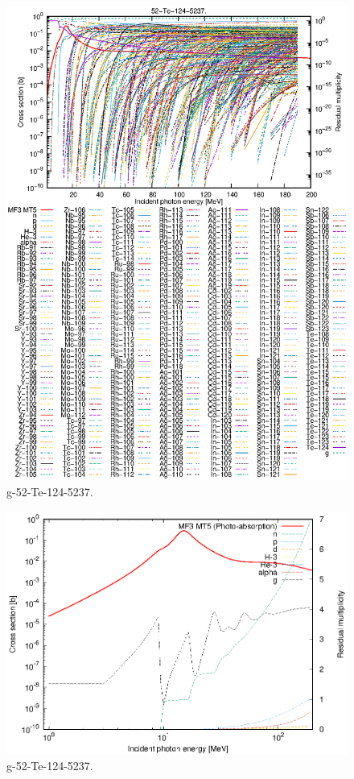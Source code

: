 \begin{figure}
 \includegraphics[width=\linewidth]{eps/g_52-Te-124_5237.eps}
  \caption{g-52-Te-124-5237.}
\end{figure}
\newpage \clearpage

\begin{figure}
 \includegraphics[width=\linewidth]{eps-log/g_52-Te-124_5237.eps}
 \caption{g-52-Te-124-5237.}
\end{figure}
\newpage \clearpage

